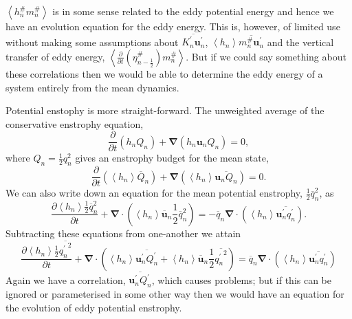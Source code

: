 \documentclass[12pt,a4paper]{report}
\newcommand*\thkmean[1]{\overline{#1}}
\newcommand*\thkres[1]{{#1}^{\prime}}
\newcommand*\nthkmean[1]{\left\langle{#1}\right\rangle}
\newcommand*\nthkres[1]{{#1}^{\#}}
\newcommand*{\half}{\frac{1}{2}}
\newcommand*{\partialdiff}[2][{}]{\frac{\partial #1}{\partial #2}}
\begin{document}
                $\nthkmean{\nthkres{h}_{n} \nthkres{m}_{n}}$ is in some sense
                related to the eddy potential energy and hence we have
                an evolution equation for the eddy energy. This
                is, however, of limited use without making some assumptions about
                $\thkmean{\thkres{K}_{n} \thkres{\boldsymbol{u}}_{n}}$, 
                $\nthkmean{h_{n}}\thkmean{\nthkres{m}_{n}\thkres{\boldsymbol{u}}_{n}}$ 
                and the vertical transfer of eddy energy, 
                $ \nthkmean{\frac{\partial}{\partial t}\left(\nthkres{\eta}_{n-\half }\right) \nthkres{m}_{n}}$. 
                But if we could say something about these correlations
                then we would be able to determine the eddy energy of a system
                entirely from the mean dynamics.
                
              
              Potential enstophy is more straight-forward. The unweighted average of the
              conservative enstrophy equation,
              \begin{equation*}
              \partialdiff{t}\left(h_{n}Q_{n}\right)+\boldsymbol{\nabla}\left(h_{n}\boldsymbol{u}_{n}Q_{n}\right) = 0,
              \end{equation*}
              where $Q_{n} = \half q_{n}^{2}$ gives an
              enstrophy budget for the mean state,  
              \begin{equation*}
              \partialdiff{t}\left(\nthkmean{h_{n}}\thkmean{Q}_{n}\right)+\boldsymbol{\nabla}\left(\nthkmean{h_{n}}\thkmean{\boldsymbol{u}_{n}Q_{n}}\right) = 0.
              \end{equation*}
              We can also write down an equation for the mean potential enstrophy,
              $\half \thkmean{q}_{n}^{2}$, as
              \begin{equation*}
               \partialdiff[\nthkmean{h_{n}} \half \thkmean{q}_{n}^{2}]{t}+   \boldsymbol{\nabla}\cdot \left(\nthkmean{h_{n}} \thkmean{\boldsymbol{u}}_{n} \half \thkmean{q}_{n}^{2}\right) =-\thkmean{q}_{n} \boldsymbol{\nabla}\cdot\left( \nthkmean{h_{n}} \thkmean{\thkres{\boldsymbol{u}}_{n}\thkres{q}_{n}} \right).
              \end{equation*}
              Subtracting these equations from one-another  we attain
              \begin{equation}
              \partialdiff[\nthkmean{h_{n}} \half \thkmean{{\thkres{q}_{n}}^{2}}]{t}+   \boldsymbol{\nabla}\cdot \left(\nthkmean{h_{n}} \thkmean{\thkres{\boldsymbol{u}}_{n} \thkres{Q}_{n}}+\nthkmean{h_{n}} \thkmean{\boldsymbol{u}}_{n} \half \thkmean{{\thkres{q}_{n}}^{2}}\right) =\thkmean{q}_{n} \boldsymbol{\nabla}\cdot\left( \nthkmean{h_{n}} \thkmean{\thkres{\boldsymbol{u}}_{n}\thkres{q}_{n}} \right)
              \label{eddyenstrophy}
              \end{equation}
              Again we have a correlation, $\thkmean{\thkres{\boldsymbol{u}}_{n} \thkres{Q}_{n}}$, which causes problems; but if this
              can be ignored or parameterised in some other way then we
              would have an equation for the evolution
              of eddy potential enstrophy.
              
\end{document}
